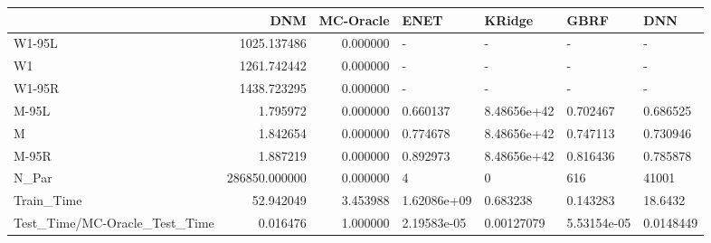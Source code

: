 \begin{tabular}{lrrllll}
\toprule
{} &            DNM &  MC-Oracle &         ENET &       KRidge &         GBRF &        DNN \\
\midrule
W1-95L                        &    1025.137486 &   0.000000 &            - &            - &            - &          - \\
W1                            &    1261.742442 &   0.000000 &            - &            - &            - &          - \\
W1-95R                        &    1438.723295 &   0.000000 &            - &            - &            - &          - \\
M-95L                         &       1.795972 &   0.000000 &     0.660137 &  8.48656e+42 &     0.702467 &   0.686525 \\
M                             &       1.842654 &   0.000000 &     0.774678 &  8.48656e+42 &     0.747113 &   0.730946 \\
M-95R                         &       1.887219 &   0.000000 &     0.892973 &  8.48656e+42 &     0.816436 &   0.785878 \\
N\_Par                         &  286850.000000 &   0.000000 &            4 &            0 &          616 &      41001 \\
Train\_Time                    &      52.942049 &   3.453988 &  1.62086e+09 &     0.683238 &     0.143283 &    18.6432 \\
Test\_Time/MC-Oracle\_Test\_Time &       0.016476 &   1.000000 &  2.19583e-05 &   0.00127079 &  5.53154e-05 &  0.0148449 \\
\bottomrule
\end{tabular}
